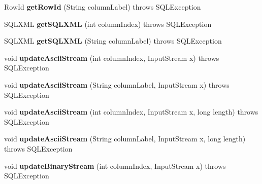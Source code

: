 \begin{DoxyCompactItemize}
Row\+Id {\bfseries get\+Row\+Id} (String column\+Label)  throws S\+Q\+L\+Exception 
\item 
\mbox{\label{classcom_1_1mysql_1_1jdbc_1_1_j_d_b_c4_result_set_a04ab8434a23b0fad588b4bd5286b930f}} 
S\+Q\+L\+X\+ML {\bfseries get\+S\+Q\+L\+X\+ML} (int column\+Index)  throws S\+Q\+L\+Exception 
\item 
\mbox{\label{classcom_1_1mysql_1_1jdbc_1_1_j_d_b_c4_result_set_a6bc6dbed14f847605648b43d082f49f4}} 
S\+Q\+L\+X\+ML {\bfseries get\+S\+Q\+L\+X\+ML} (String column\+Label)  throws S\+Q\+L\+Exception 
\item 
\mbox{\label{classcom_1_1mysql_1_1jdbc_1_1_j_d_b_c4_result_set_ac45f3493adda070d1f1010265c6199b0}} 
void {\bfseries update\+Ascii\+Stream} (int column\+Index, Input\+Stream x)  throws S\+Q\+L\+Exception 
\item 
\mbox{\label{classcom_1_1mysql_1_1jdbc_1_1_j_d_b_c4_result_set_afafc1ade7b59c5b624a93fb26ea4afdd}} 
void {\bfseries update\+Ascii\+Stream} (String column\+Label, Input\+Stream x)  throws S\+Q\+L\+Exception 
\item 
\mbox{\label{classcom_1_1mysql_1_1jdbc_1_1_j_d_b_c4_result_set_a59cecf0d71db748cb3a0ade17574a745}} 
void {\bfseries update\+Ascii\+Stream} (int column\+Index, Input\+Stream x, long length)  throws S\+Q\+L\+Exception 
\item 
\mbox{\label{classcom_1_1mysql_1_1jdbc_1_1_j_d_b_c4_result_set_a4f0864e409797638a3d1acdf2c239f27}} 
void {\bfseries update\+Ascii\+Stream} (String column\+Label, Input\+Stream x, long length)  throws S\+Q\+L\+Exception 
\item 
\mbox{\label{classcom_1_1mysql_1_1jdbc_1_1_j_d_b_c4_result_set_abe794b3d7631a5474f24ddaeea029c54}} 
void {\bfseries update\+Binary\+Stream} (int column\+Index, Input\+Stream x)  throws S\+Q\+L\+Exception 
\item 
\mbox{\label{classcom_1_1mysql_1_1jdbc_1_1_j_d_b_c4_result_set_a899bd17d5c035d07e1279a3c539709ff}} 

\end{DoxyCompactItemize}

